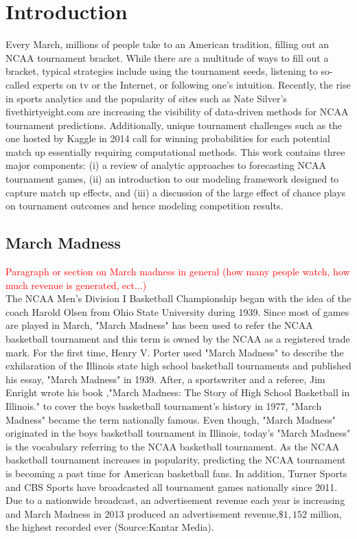 \section{Introduction}

Every March, millions of people take to an American tradition, filling out an NCAA tournament bracket. While there are a multitude of ways to fill out a bracket, typical strategies include using the tournament seeds, listening to so-called experts on tv or the Internet, or following one's intuition. Recently, the rise in sports analytics and the popularity of sites such as Nate Silver's fivethirtyeight.com are increasing the visibility of data-driven methods for NCAA tournament predictions. Additionally, unique tournament challenges such as the one hosted by Kaggle in 2014 call for winning probabilities for each potential match up essentially requiring computational methods. This work contains three major components: (i) a review of analytic approaches to forecasting NCAA tournament games, (ii) an introduction to our modeling framework designed to capture match up effects, and (iii) a discussion of the large effect of chance plays on tournament outcomes and hence modeling competition results.

\subsection{March Madness}
\textcolor{red}{Paragraph or section on March madness in general (how many people watch, how much revenue is generated, ect...)}\\
The NCAA Men's Division I Basketball Championship began with the idea of the coach Harold Olsen from Ohio State University during 1939. Since most of games are played in March, "March Madness" has been used to refer the NCAA basketball tournament and this term is owned by the NCAA as a registered trade mark.
For the first time, Henry V. Porter used "March Madness" to describe the exhilaration of the Illinois state high school basketball tournaments and published his essay, "March Madness" in 1939.  After, a sportswriter and a referee, Jim Enright wrote his book ,"March Madness: The Story of High School Basketball in Illinois." to cover the boys basketball tournament's history in 1977, "March Madness" became the term nationally famous.  Even though, "March Madness"  originated in the boys basketball tournament in Illinois, today's "March Madness" is the vocabulary referring to the NCAA basketball tournament.
As the NCAA basketball tournament increases in popularity, predicting the NCAA tournament is becoming a past time for American basketball fans. In addition, Turner Sports and CBS Sports have broadcasted all tournament games nationally since 2011. Due to a nationwide broadcast, an advertisement revenue each year is increasing and March Madness in 2013 produced an advertisement revenue,$\$ 1,152$ million, the highest recorded ever (Source:Kantar Media).

